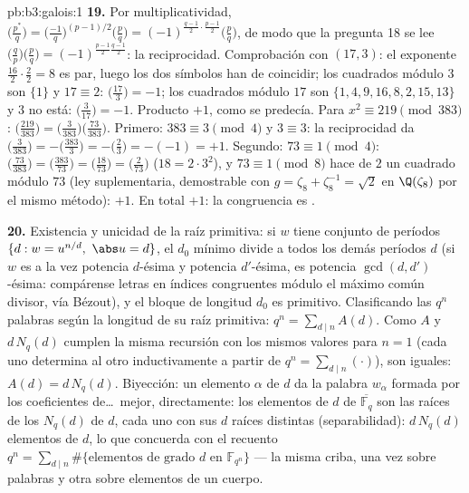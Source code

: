 \begin{solution}{pb:b3:galois:1}
\textbf{19.} Por multiplicatividad, $\bigl(\frac{p^*}q\bigr) =
\bigl(\frac{-1}q\bigr)^{(p-1)/2}\bigl(\frac pq\bigr) =
(-1)^{\frac{q-1}2\cdot\frac{p-1}2}\bigl(\frac pq\bigr)$, de modo que la
pregunta 18 se lee $\bigl(\frac qp\bigr)\bigl(\frac
pq\bigr) = (-1)^{\frac{p-1}2\frac{q-1}2}$: la reciprocidad. Comprobación
con $(17, 3)$: el exponente $\frac{16}2\cdot\frac22 = 8$ es par, luego
los dos símbolos han de coincidir; los cuadrados módulo $3$ son $\{1\}$
y $17 \equiv 2$: $\bigl(\frac{17}3\bigr) = -1$; los cuadrados módulo
$17$ son $\{1, 4,
9, 16, 8, 2, 15, 13\}$ y $3$ no está: $\bigl(\frac3{17}\bigr) = -1$.
Producto $+1$, como se predecía. Para $x^2
\equiv 219 \pmod{383}$: $\bigl(\frac{219}{383}\bigr) =
\bigl(\frac3{383}\bigr)\bigl(\frac{73}{383}\bigr)$. Primero:
$383 \equiv 3 \pmod4$ y $3 \equiv 3$: la reciprocidad da
$\bigl(\frac3{383}\bigr) = -\bigl(\frac{383}3\bigr) =
-\bigl(\frac23\bigr) = -(-1) = +1$. Segundo: $73 \equiv 1
\pmod 4$: $\bigl(\frac{73}{383}\bigr) =
\bigl(\frac{383}{73}\bigr) = \bigl(\frac{18}{73}\bigr) =
\bigl(\frac2{73}\bigr)$ ($18 = 2\cdot3^2$), y $73 \equiv 1
\pmod 8$ hace de $2$ un cuadrado módulo $73$ (ley suplementaria,
demostrable con $g = \zeta_8 + \zeta_8^{-1} = \sqrt2$ en $\Q(\zeta_8)$
por el mismo método): $+1$. En total $+1$: la congruencia es
.

\textbf{20.} Existencia y unicidad de la raíz primitiva: si $w$ tiene
conjunto de períodos $\{d : w = u^{n/d},\ \abs u = d\}$, el $d_0$ mínimo
divide a todos los demás períodos $d$ (si $w$ es a la vez potencia
$d$-ésima y potencia $d'$-ésima, es potencia $\gcd(d, d')$-ésima:
compárense letras en índices congruentes módulo el máximo común divisor,
vía Bézout), y el bloque de longitud $d_0$ es primitivo. Clasificando
las $q^n$ palabras según la longitud de su raíz primitiva:
$q^n = \sum_{d \mid n}A(d)$. Como $A$ y $d\,N_q(d)$ cumplen la misma
recursión con los mismos valores para $n = 1$ (cada uno determina al
otro inductivamente a partir de $q^n
= \sum_{d\mid n}(\cdot)$), son iguales: $A(d) =
d\,N_q(d)$. Biyección: un elemento $\alpha$ de
 $d$ da la palabra $w_\alpha$
formada por los coeficientes de\dots\ mejor, directamente: los elementos
de  $d$ de
$\overline{\mathbb F_q}$ son las raíces de los $N_q(d)$
 de
 $d$, cada uno con sus $d$ raíces
distintas (separabilidad): $d\,N_q(d)$ elementos de
 $d$, lo que concuerda con el
recuento $q^n = \sum_{d\mid n}\#\{
\text{elementos de grado } d \text{ en } \mathbb F_{q^n}\}$ --- la misma
criba, una vez sobre palabras y otra sobre elementos de un cuerpo.


\end{solution}
